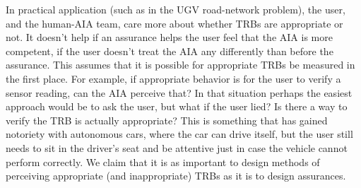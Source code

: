     In practical application (such as in the UGV road-network problem), the user, and the human-AIA team, care more about whether TRBs are appropriate or not. It doesn't help if an assurance helps the user feel that the AIA is more competent, if the user doesn't treat the AIA any differently than before the assurance. This assumes that it is possible for appropriate TRBs be measured in the first place. For example, if appropriate behavior is for the user to verify a sensor reading, can the AIA perceive that? In that situation perhaps the easiest approach would be to ask the user, but what if the user lied? Is there a way to verify the TRB is actually appropriate? This is something that has gained notoriety with autonomous cars, where the car can drive itself, but the user still needs to sit in the driver's seat and be attentive just in case the vehicle cannot perform correctly. We claim that it is as important to design methods of perceiving appropriate (and inappropriate) TRBs as it is to design assurances. 
%
%
%
